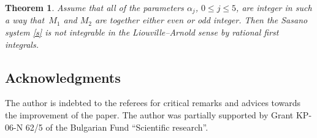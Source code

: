 \documentclass[pdftex]{sigma}
\numberwithin{equation}{section}
\newtheorem{Theorem}{Theorem}[section]
\begin{document}
 \begin{Theorem}\label{2}
 Assume that all of the parameters $\alpha_j$, $0 \leq j \leq 5$, are integer in such a way that~$M_1$ and $M_2$ are together either even or odd integer. Then the Sasano system
 \eqref{s} is not integrable in the Liouville--Arnold sense by rational first integrals.
 \end{Theorem}

 \subsection*{Acknowledgments}
 The author is indebted to the referees for critical remarks and advices towards the improvement of the paper.
The author was partially supported by Grant KP-06-N 62/5 of the Bulgarian Fund
 ``Scientific research''.
\end{document}
